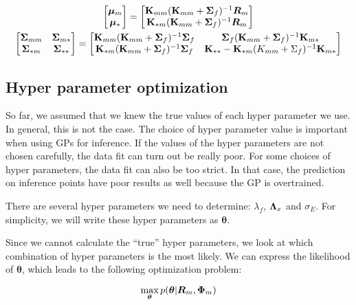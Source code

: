 \documentclass[mscThesis.tex]{subfiles}
\begin{document}
\begin{gather}
\begin{bmatrix}
\bm{\mu}_{m} \\
\bm{\mu}_{*}
\end{bmatrix} 
=
\begin{bmatrix}
\mathbf{K}_{mm} (\mathbf{K}_{mm} + \mathbf{\Sigma}_f)^{-1} \bm{R}_m \\
\mathbf{K}_{*m} (\mathbf{K}_{mm} + \mathbf{\Sigma}_f)^{-1} \bm{R}_m
\end{bmatrix} \\
\begin{bmatrix}
\mathbf{\Sigma}_{mm} & \mathbf{\Sigma}_{m*} \\
\mathbf{\Sigma}_{*m} & \mathbf{\Sigma}_{**} 
\end{bmatrix} 
=
\begin{bmatrix}
\mathbf{K}_{mm} (\mathbf{K}_{mm} + \mathbf{\Sigma}_f)^{-1} \mathbf{\Sigma}_f 
& \mathbf{\Sigma}_f (\mathbf{K}_{mm} + \mathbf{\Sigma}_f)^{-1} \mathbf{K}_{m*}\\
\mathbf{K}_{*m} (\mathbf{K}_{mm} + \mathbf{\Sigma}_f)^{-1} \mathbf{\Sigma}_f 
& \mathbf{K}_{**} - \mathbf{K}_{*m}(K_{mm}+\Sigma_f)^{-1} \mathbf{K}_{m*}
\end{bmatrix}
\end{gather}


\subsection{Hyper parameter optimization}
\label{sec:hyper-opt}
So far, we assumed that we knew the true values of each hyper parameter we use. In general, this is not the case. The choice of hyper parameter value is important when using GPs for inference. If the values of the hyper parameters are not chosen carefully, the data fit can turn out be really poor. For some choices of hyper parameters, the data fit can also be too strict. In that case, the prediction on inference points have poor results as well because the GP is overtrained.

There are several hyper parameters we need to determine: $\lambda_f$, $\mathbf{\Lambda}_x$ and $\sigma_E$. For simplicity, we will write these hyper parameters as $\bm{\theta}$. 

Since we cannot calculate the ``true'' hyper parameters, we look at which combination of hyper parameters is the most likely. We can express the likelihood of $\bm{\theta}$, which leads to the following optimization problem:

\begin{equation*} 
\max_{\bm{\theta}} p(\bm{\theta} | \bm{R}_m, \mathbf{\Phi}_m) 
\end{equation*}
 
\end{document}
